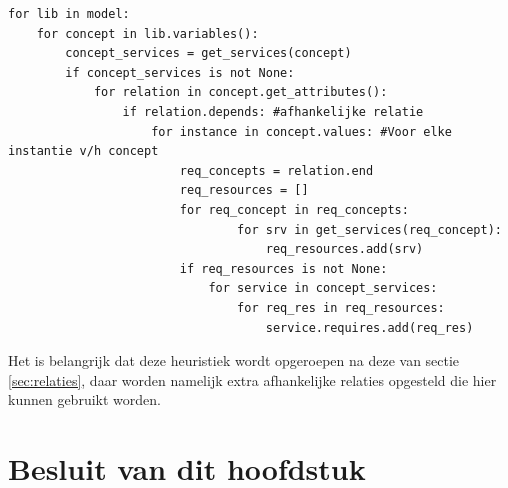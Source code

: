 \begin{minipage}{\textwidth}
\begin{lstlisting}
for lib in model:
    for concept in lib.variables():
        concept_services = get_services(concept)
        if concept_services is not None:
            for relation in concept.get_attributes():
                if relation.depends: #afhankelijke relatie
                    for instance in concept.values: #Voor elke instantie v/h concept
                        req_concepts = relation.end
                        req_resources = []
                        for req_concept in req_concepts:
                                for srv in get_services(req_concept):
                                    req_resources.add(srv)
                        if req_resources is not None: 
                            for service in concept_services:
                                for req_res in req_resources:
                                    service.requires.add(req_res)
\end{lstlisting}
\end{minipage}

Het is belangrijk dat deze heuristiek wordt opgeroepen na deze van sectie \ref{sec:relaties}, daar worden namelijk extra afhankelijke relaties opgesteld die hier kunnen gebruikt worden.

\section{Besluit van dit hoofdstuk}


